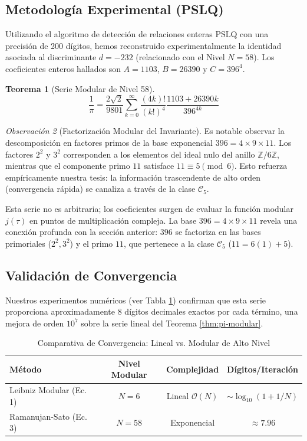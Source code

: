 \documentclass{article}
\theoremstyle{plain}
\newtheorem{theorem}{Teorema}[section]
\theoremstyle{definition}
\theoremstyle{remark}
\newtheorem{remark}[theorem]{Observación}
\numberwithin{equation}{section}
\begin{document}
\subsection{Metodología Experimental (PSLQ)}
Utilizando el algoritmo de detección de relaciones enteras PSLQ con una precisión de 200 dígitos, hemos reconstruido experimentalmente la identidad asociada al discriminante $d = -232$ (relacionado con el Nivel $N=58$). Los coeficientes enteros hallados son $A=1103$, $B=26390$ y $C=396^4$.

\begin{theorem}[Serie Modular de Nivel 58]
\begin{equation}
\frac{1}{\pi} = \frac{2\sqrt{2}}{9801} \sum_{k=0}^{\infty} \frac{(4k)!}{(k!)^4} \frac{1103 + 26390k}{396^{4k}}
\end{equation}
\end{theorem}

\begin{remark}[Factorización Modular del Invariante]
Es notable observar la descomposición en factores primos de la base exponencial $396 = 4 \times 9 \times 11$. Los factores $2^2$ y $3^2$ corresponden a los elementos del ideal nulo del anillo $\mathbb{Z}/6\mathbb{Z}$, mientras que el componente primo $11$ satisface $11 \equiv 5 \pmod 6$. Esto refuerza empíricamente nuestra tesis: la información trascendente de alto orden (convergencia rápida) se canaliza a través de la clase $\mathcal{C}_5$.
\end{remark}

Esta serie no es arbitraria; los coeficientes surgen de evaluar la función modular $j(\tau)$ en puntos de multiplicación compleja. La base $396 = 4 \times 9 \times 11$ revela una conexión profunda con la sección anterior: $396$ se factoriza en las bases primoriales ($2^2, 3^2$) y el primo $11$, que pertenece a la clase $\mathcal{C}_5$ ($11 = 6(1)+5$).

\subsection{Validación de Convergencia}
Nuestros experimentos numéricos (ver Tabla \ref{tab:conv}) confirman que esta serie proporciona aproximadamente 8 dígitos decimales exactos por cada término, una mejora de orden $10^7$ sobre la serie lineal del Teorema \ref{thm:pi-modular}.

\begin{table}[h]
\centering
\caption{Comparativa de Convergencia: Lineal vs. Modular de Alto Nivel}
\label{tab:conv}
\begin{tabular}{@{}lccc@{}}
\toprule
\textbf{Método} & \textbf{Nivel Modular} & \textbf{Complejidad} & \textbf{Dígitos/Iteración} \\ \midrule
Leibniz Modular (Ec. 1) & $N=6$ & Lineal $\mathcal{O}(N)$ & $\sim \log_{10}(1 + 1/N)$ \\
Ramanujan-Sato (Ec. 3) & $N=58$ & Exponencial & $\approx 7.96$ \\ \bottomrule
\end{tabular}
\end{table}
\end{document}
